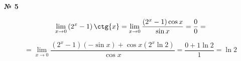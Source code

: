 \documentclass{article}
\begin{document}
\textbf{№ 5} 

\begingroup
\Large

$$ \lim\limits_{x \to 0} \left( 2^x-1 \right) \ctg{x}
= \lim\limits_{x \to 0} \frac{\left( 2^x-1 \right) \cos{x}}{\sin{x}} 
= \frac{0}{0}
= $$

$$ = \lim\limits_{x \to 0} \frac{\left( 2^x-1 \right) (-\sin{x}) + \cos{x}(2^x\ln{2})}{\cos{x}} 
= \frac{0+1\ln{2}}{1} 
= \ln{2} $$

\endgroup
\end{document}
